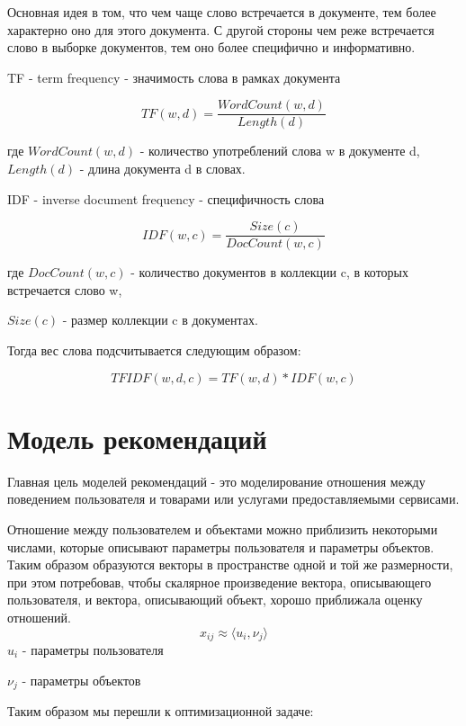 Основная идея в том, что чем чаще слово встречается в документе, тем более характерно оно для этого документа.
С другой стороны чем реже встречается слово в выборке документов, тем оно более специфично и информативно.

TF - term frequency - значимость слова в рамках документа \cite{tfidf}

\begin{equation}
	TF(w, d) = \frac{WordCount(w, d)}{Length(d)} 
\end{equation}

где $WordCount(w, d)$ - количество употреблений слова w в документе d,
$Length(d)$ - длина документа d в словах. 


IDF - inverse document frequency - специфичность слова \cite{tfidf}

\begin{equation}
	IDF(w, c) = \frac{Size(c)}{DocCount(w, c)}
\end{equation}

где $DocCount(w, c)$ - количество документов в коллекции c, в которых встречается слово w,

$Size(c)$ - размер коллекции c в документах.

Тогда вес слова подсчитывается следующим образом:


\begin{equation}
	TFIDF(w, d, c) = TF(w, d) * IDF(w, c)
\end{equation}

\section{Модель рекомендаций}
Главная цель моделей рекомендаций - это моделирование отношения между поведением пользователя и товарами или услугами предоставляемыми сервисами.

Отношение между пользователем и объектами можно приблизить некоторыми числами, которые описывают параметры пользователя и параметры объектов. Таким образом образуются векторы в пространстве одной и той же размерности,
при этом потребовав, чтобы скалярное произведение вектора, описывающего пользователя, и вектора, описывающий объект, хорошо приближала оценку отношений.
\begin{equation}
	x_{ij} \approx \langle u_i, \nu_j \rangle
\end{equation}
$u_i$ - параметры пользователя

$\nu_j$ - параметры объектов

Таким образом мы перешли к оптимизационной задаче:

